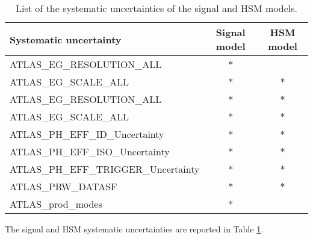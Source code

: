 \documentclass[a4paper, oneside, 11pt, openright]{book}
\begin{document}
 			\begin{center}
 				\begin{table}[tbp]
 					\centering
 					\begin{tabular}{lcc}
 						\toprule[1.5pt]
 						Systematic uncertainty					& Signal model	& HSM model	\\
 						\midrule
 						ATLAS\_EG\_RESOLUTION\_ALL				& $\ast$		& 			\\
 						ATLAS\_EG\_SCALE\_ALL					& $\ast$		& $\ast$	\\
 						\midrule
 						ATLAS\_EG\_RESOLUTION\_ALL				& $\ast$		& $\ast$	\\
 						ATLAS\_EG\_SCALE\_ALL					& $\ast$		& $\ast$	\\
 						ATLAS\_PH\_EFF\_ID\_Uncertainty			& $\ast$		& $\ast$	\\
 						ATLAS\_PH\_EFF\_ISO\_Uncertainty		& $\ast$		& $\ast$	\\
 						ATLAS\_PH\_EFF\_TRIGGER\_Uncertainty	& $\ast$		& $\ast$	\\
 						ATLAS\_PRW\_DATASF						& $\ast$		& $\ast$	\\
 						ATLAS\_prod\_modes						& $\ast$		& 			\\
 						\bottomrule[1.5pt]
 					\end{tabular}
 					\caption{List of the systematic uncertainties of the signal and HSM models.}
 					\label{tab:sig_HSM_syst}
 				\end{table}
 			\end{center}
 			\vspace{-2.cm}
 			The signal and HSM systematic uncertainties are reported in Table \ref{tab:sig_HSM_syst}.
 			
 			
 				
 				
\end{document}
